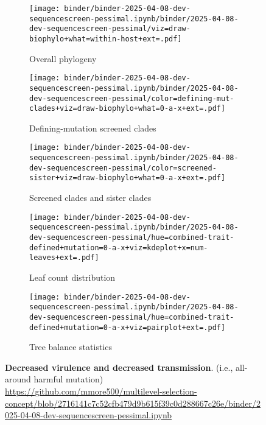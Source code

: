 \begin{figure*}[htbp]
  \centering
  \begin{subfigure}{0.32\textwidth}
    \centering
    \texttt{[image: binder/binder-2025-04-08-dev-sequencescreen-pessimal.ipynb/binder/2025-04-08-dev-sequencescreen-pessimal/viz=draw-biophylo+what=within-host+ext=.pdf]}
    \caption{Overall phylogeny}
    \label{fig:dev-sequencescreen-pessimal:overall_phylogeny}
  \end{subfigure}
  \hfill
  \begin{subfigure}{0.32\textwidth}
    \centering
    \texttt{[image: binder/binder-2025-04-08-dev-sequencescreen-pessimal.ipynb/binder/2025-04-08-dev-sequencescreen-pessimal/color=defining-mut-clades+viz=draw-biophylo+what=0-a-x+ext=.pdf]}
    \caption{Defining-mutation screened clades}
    \label{fig:dev-sequencescreen-pessimal:defining_mut_clades}
  \end{subfigure}
  \hfill
  \begin{subfigure}{0.32\textwidth}
    \centering
    \texttt{[image: binder/binder-2025-04-08-dev-sequencescreen-pessimal.ipynb/binder/2025-04-08-dev-sequencescreen-pessimal/color=screened-sister+viz=draw-biophylo+what=0-a-x+ext=.pdf]}
    \caption{Screened clades and sister clades}
    \label{fig:dev-sequencescreen-pessimal:screened_sister}
  \end{subfigure}

  \vspace{0.5cm} %

  \begin{subfigure}{0.54\textwidth}
    \centering
    \texttt{[image: binder/binder-2025-04-08-dev-sequencescreen-pessimal.ipynb/binder/2025-04-08-dev-sequencescreen-pessimal/hue=combined-trait-defined+mutation=0-a-x+viz=kdeplot+x=num-leaves+ext=.pdf]}
    \caption{Leaf count distribution}
    \label{fig:dev-sequencescreen-pessimal:leaf_count}
  \end{subfigure}
  \hfill
  \begin{subfigure}{0.44\textwidth}
    \centering
    \texttt{[image: binder/binder-2025-04-08-dev-sequencescreen-pessimal.ipynb/binder/2025-04-08-dev-sequencescreen-pessimal/hue=combined-trait-defined+mutation=0-a-x+viz=pairplot+ext=.pdf]}
    \caption{Tree balance statistics}
    \label{fig:dev-sequencescreen-pessimal:tree_balance}
  \end{subfigure}

  \caption{\textbf{Decreased virulence and decreased transmission}. (i.e., all-around harmful mutation) \url{https://github.com/mmore500/multilevel-selection-concept/blob/2716141c7c52cfb479d9b615f39c0d288667c26e/binder/2025-04-08-dev-sequencescreen-pessimal.ipynb}}
  \label{fig:dev-sequencescreen-pessimal}
\end{figure*}
